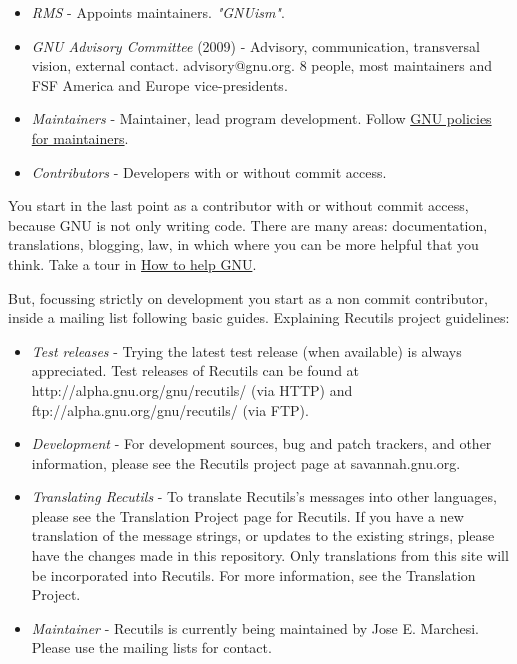 \begin{itemize}
	\item \textit{RMS} - Appoints maintainers. \textit{"GNUism"}.
	\item \textit{GNU Advisory Committee} (2009) - Advisory, communication, transversal vision, external contact. advisory@gnu.org. 8 people, most maintainers and FSF America and Europe vice-presidents.
	\item \textit{Maintainers} - Maintainer, lead program development. Follow \href{http://www.gnu.org/prep/maintain_toc.html}{GNU policies for maintainers}.
	\item \textit{Contributors} - Developers with or without commit access.
\end{itemize} You start in the last point as a contributor with or without commit access, because GNU is not only writing code. There are many areas: documentation, translations, blogging, law, in which where you can be more helpful that you think. Take a tour in \href{http://www.gnu.org/help/}{How to help GNU}.

\par But, focussing strictly on development you start as a non commit contributor, inside a mailing list following basic guides. Explaining Recutils project guidelines:

\begin{itemize}
	\item \textit{Test releases} - Trying the latest test release (when available) is always appreciated. Test releases of Recutils can be found at http://alpha.gnu.org/gnu/recutils/ (via HTTP) and ftp://alpha.gnu.org/gnu/recutils/ (via FTP).
	\item \textit{Development} - For development sources, bug and patch trackers, and other information, please see the Recutils project page at savannah.gnu.org.
	\item \textit{Translating Recutils} - To translate Recutils's messages into other languages, please see the Translation Project page for Recutils. If you have a new translation of the message strings, or updates to the existing strings, please have the changes made in this repository. Only translations from this site will be incorporated into Recutils. For more information, see the Translation Project.
	\item \textit{Maintainer} - Recutils is currently being maintained by Jose E. Marchesi. Please use the mailing lists for contact.
\end{itemize}

